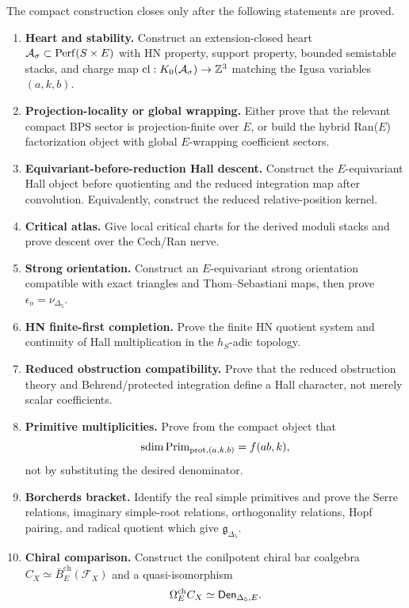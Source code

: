 The compact construction closes only after the following statements are
proved.
\begin{enumerate}
\item \textbf{Heart and stability.}  Construct an extension-closed heart
\(\mathcal A_\sigma\subset\operatorname{Perf}(S\times E)\) with HN property, support
property, bounded semistable stacks, and charge map
\(\operatorname{cl}:K_0(\mathcal A_\sigma)\to\mathbb Z^3\) matching the Igusa
variables \((a,k,b)\).
\item \textbf{Projection-locality or global wrapping.}  Either prove that
the relevant compact BPS sector is projection-finite over \(E\), or build
the hybrid Ran(\(E\)) factorization object with global \(E\)-wrapping
coefficient sectors.
\item \textbf{Equivariant-before-reduction Hall descent.}  Construct the
\(E\)-equivariant Hall object before quotienting and the reduced
integration map after convolution.  Equivalently, construct the reduced
relative-position kernel.
\item \textbf{Critical atlas.}  Give local critical charts for the
derived moduli stacks and prove descent over the Cech/Ran nerve.
\item \textbf{Strong orientation.}  Construct an \(E\)-equivariant strong
orientation compatible with exact triangles and Thom--Sebastiani maps,
then prove \(\epsilon_o=\nu_{\Delta_5}\).
\item \textbf{HN finite-first completion.}  Prove the finite HN quotient
system and continuity of Hall multiplication in the \(h_S\)-adic topology.
\item \textbf{Reduced obstruction compatibility.}  Prove that the
reduced obstruction theory and Behrend/protected integration define a
Hall character, not merely scalar coefficients.
\item \textbf{Primitive multiplicities.}  Prove from the compact object
that
\[
\operatorname{sdim}\operatorname{Prim}_{\mathrm{prot},(a,k,b)}=f(ab,k),
\]
not by substituting the desired denominator.
\item \textbf{Borcherds bracket.}  Identify the real simple primitives
and prove the Serre relations, imaginary simple-root relations,
orthogonality relations, Hopf pairing, and radical quotient which give
\(\mathfrak g_{\Delta_5}\).
\item \textbf{Chiral comparison.}  Construct the conilpotent chiral bar
coalgebra \(C_X\simeq\bar B_E^{\mathrm{ch}}(\mathcal F_X)\) and a
quasi-isomorphism
\[
\Omega_E^{\mathrm{ch}}C_X\simeq
\mathsf{Den}_{\Delta_5,E}.
\]
\end{enumerate}

